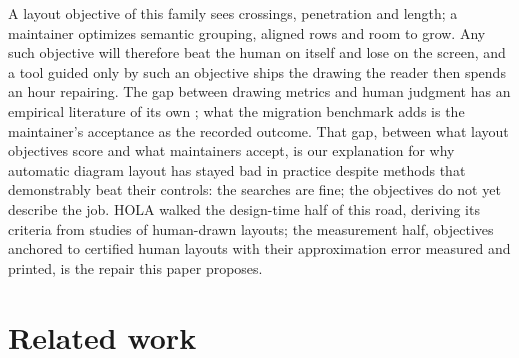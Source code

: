 \documentclass[11pt]{article}
\begin{document}
A layout objective of this family sees crossings, penetration and length; a maintainer
optimizes semantic grouping, aligned rows and room to grow. Any such objective will
therefore beat the human on itself and lose on the screen, and a tool guided only by such
an objective ships the drawing the reader then spends an hour repairing. The gap between
drawing metrics and human judgment has an empirical literature of its own
\cite{purchase02}; what the migration benchmark adds is the maintainer's acceptance as the
recorded outcome. That gap, between what layout objectives score and what maintainers
accept, is our explanation for why automatic diagram layout has stayed bad in practice
despite methods that demonstrably beat their controls: the searches are fine; the
objectives do not yet describe the job. HOLA \cite{hola16} walked the design-time half of
this road, deriving its criteria from studies of human-drawn layouts; the measurement half,
objectives anchored to certified human layouts with their approximation error measured and
printed, is the repair this paper proposes.

\section{Related work}
\end{document}
